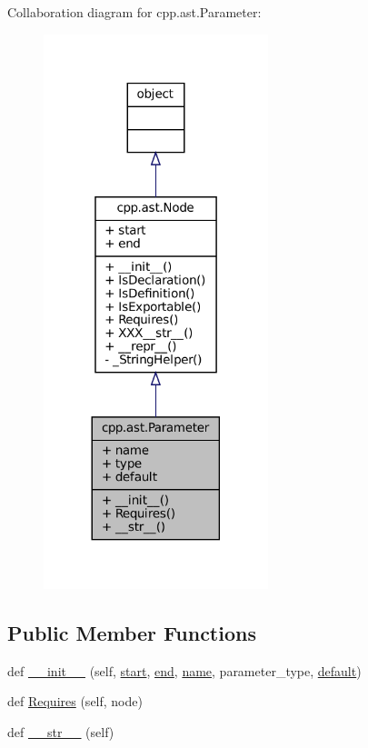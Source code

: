 Collaboration diagram for cpp.\+ast.\+Parameter\+:
\nopagebreak
\begin{figure}[H]
\begin{center}
\leavevmode
\includegraphics[width=185pt]{classcpp_1_1ast_1_1Parameter__coll__graph}
\end{center}
\end{figure}
\subsection*{Public Member Functions}
\begin{DoxyCompactItemize}
\item 
def \hyperlink{classcpp_1_1ast_1_1Parameter_a4fe27f559d44adac9e9b5898ba76c5b3}{\+\_\+\+\_\+init\+\_\+\+\_\+} (self, \hyperlink{classcpp_1_1ast_1_1Node_a7b2aa97e6a049bb1a93aea48c48f1f44}{start}, \hyperlink{classcpp_1_1ast_1_1Node_a3c5e5246ccf619df28eca02e29d69647}{end}, \hyperlink{classcpp_1_1ast_1_1Parameter_aae0375fb0ded8fa9090feea6bdff2784}{name}, parameter\+\_\+type, \hyperlink{classcpp_1_1ast_1_1Parameter_a4ceae2ac87d82c5542c4e7385eb4c97e}{default})
\item 
def \hyperlink{classcpp_1_1ast_1_1Parameter_a4bc5c17a0d606d35be40cb4c2c1a67a6}{Requires} (self, node)
\item 
def \hyperlink{classcpp_1_1ast_1_1Parameter_aabfbabb3c744a0da4a012ceb4299947a}{\+\_\+\+\_\+str\+\_\+\+\_\+} (self)
\end{DoxyCompactItemize}
